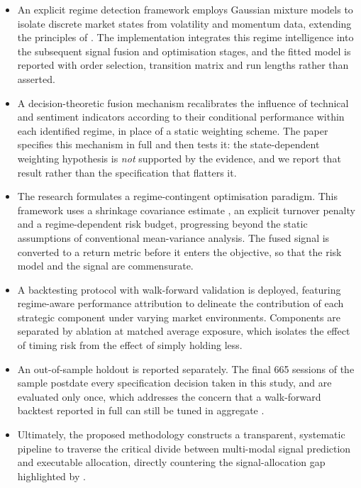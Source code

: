 \documentclass{singlecol-new}
\theoremstyle{TH}{
\newtheorem{lemma}{Lemma}
\newtheorem{theorem}[lemma]{Theorem}
\newtheorem{corrolary}[lemma]{Corrolary}
\newtheorem{conjecture}[lemma]{Conjecture}
\newtheorem{proposition}[lemma]{Proposition}
\newtheorem{claim}[lemma]{Claim}
\newtheorem{stheorem}[lemma]{Wrong Theorem}
\newtheorem{algorithm}{Algorithm}
}
\theoremstyle{THrm}{
\newtheorem{definition}{Definition}[section]
\newtheorem{question}{Question}[section]
\newtheorem{remark}{Remark}
\newtheorem{scheme}{Scheme}
}
\theoremstyle{THhit}{
\newtheorem{case}{Case}[section]
}
\begin{document}
\begin{itemize}

\item An explicit regime detection framework employs Gaussian mixture models to isolate
discrete market states from volatility and momentum data, extending the principles of
\citet{wang19}. The implementation integrates this regime intelligence into the
subsequent signal fusion and optimisation stages, and the fitted model is reported with
order selection, transition matrix and run lengths rather than asserted.

\item A decision-theoretic fusion mechanism recalibrates the influence of technical and
sentiment indicators according to their conditional performance within each identified
regime, in place of a static weighting scheme. The paper specifies this mechanism in full
and then tests it: the state-dependent weighting hypothesis is \emph{not} supported by
the evidence, and we report that result rather than the specification that flatters it.

\item The research formulates a regime-contingent optimisation paradigm. This framework
uses a shrinkage covariance estimate \citep{ledoit04}, an explicit turnover penalty and a
regime-dependent risk budget, progressing beyond the static assumptions of conventional
mean-variance analysis. The fused signal is converted to a return metric before it enters
the objective, so that the risk model and the signal are commensurate.

\item A backtesting protocol with walk-forward validation is deployed, featuring
regime-aware performance attribution to delineate the contribution of each strategic
component under varying market environments. Components are separated by ablation at
matched average exposure, which isolates the effect of timing risk from the effect of
simply holding less.

\item An out-of-sample holdout is reported separately. The final 665 sessions of the
sample postdate every specification decision taken in this study, and are evaluated only
once, which addresses the concern that a walk-forward backtest reported in full can still
be tuned in aggregate \citep{harvey15,prado16}.

\item Ultimately, the proposed methodology constructs a transparent, systematic pipeline
to traverse the critical divide between multi-modal signal prediction and executable
allocation, directly countering the signal-allocation gap highlighted by
\citet{zhang22}.
\end{itemize}
\end{document}
